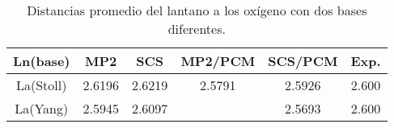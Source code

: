 \begin{table}[h!]
\centering
\caption{\footnotesize Distancias promedio del lantano a los 
ox\'igeno con dos bases diferentes.}
\begin{tabular}{c|cccc|c}\hline\hline
Ln(base)  & MP2    & SCS    & MP2/PCM & SCS/PCM & Exp.  \\ \hline
La(Stoll) & 2.6196 & 2.6219 & 2.5791  & 2.5926  & 2.600 \\ 
La(Yang)  & 2.5945 & 2.6097 &         & 2.5693  & 2.600 \\ 
\hline \end{tabular}\label{t3}\end{table}
